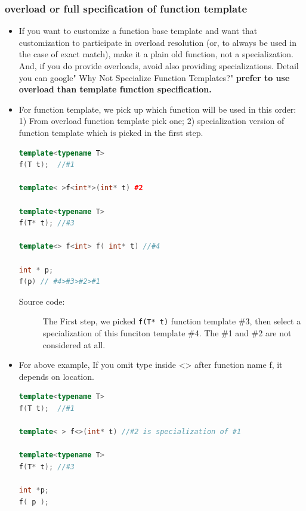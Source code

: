 \documentclass[a4paper,11pt,twoside]{book}
\begin{document}
\subsubsection{overload or full specification of function template}

\begin{itemize}
	\item  If you want to customize a function base template and want that customization to participate in overload resolution (or, to always be used in the case of exact match), make it a plain old function, not a specialization. And, if you do provide overloads, avoid also providing specializations. Detail you can google" Why Not Specialize Function Templates?" \textbf{prefer to use overload than template function specification.}

	\item For function template, we pick up which function will be used in this order: 1) From overload function template pick one; 2) specialization version of function template which is picked in the first step.

\begin{lstlisting}[frame=single, language=c++]
template<typename T>
f(T t);  //#1

template< >f<int*>(int* t) #2

template<typename T>
f(T* t); //#3

template<> f<int> f( int* t) //#4

int * p;
f(p) // #4>#3>#2>#1
\end{lstlisting}
\begin{description}
	\item[Source code:] The First step, we picked \texttt{f(T* t)} function template \#3, then select a specialization of this funciton template \#4. The \#1 and \#2 are not considered at all.
\end{description}

\item For above example, If you omit type inside <> after function name f, it depends on location.
\begin{lstlisting}[frame=single, language=c++]
template<typename T>
f(T t);  //#1

template< > f<>(int* t) //#2 is specialization of #1

template<typename T>
f(T* t); //#3

int *p; 
f( p ); 
\end{lstlisting}
\begin{description}
	

\end{description}
\end{itemize}
\end{document}
